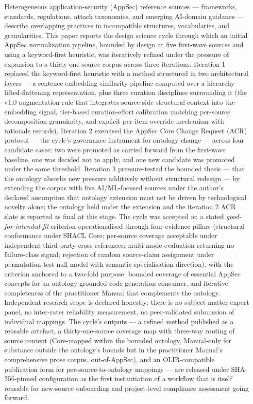 \documentclass[
]{article}
\begin{document}
Heterogeneous application-security (AppSec) reference sources ---
frameworks, standards, regulations, attack taxonomies, and emerging
AI-domain guidance --- describe overlapping practices in incompatible
structures, vocabularies, and granularities. This paper reports the
design science cycle through which an initial AppSec normalization
pipeline, bounded by design at five first-wave sources and using a
keyword-first heuristic, was iteratively refined under the pressure of
expansion to a thirty-one-source corpus across three iterations.
Iteration 1 replaced the keyword-first heuristic with a method
structured in two architectural layers --- a sentence-embedding
similarity pipeline computed over a hierarchy-lifted-flattening
representation, plus three curation disciplines surrounding it (the v1.0
augmentation rule that integrates source-side structural context into
the embedding signal, tier-based curation-effort calibration matching
per-source decomposition granularity, and explicit per-item override
mechanism with rationale records). Iteration 2 exercised the AppSec Core
Change Request (ACR) protocol --- the cycle's governance instrument for
ontology change --- across four candidate cases: two were promoted as
carried forward from the first-wave baseline, one was decided not to
apply, and one new candidate was promoted under the same threshold.
Iteration 3 pressure-tested the bounded thesis --- that the ontology
absorbs new pressure additively without structural redesign --- by
extending the corpus with five AI/ML-focused sources under the author's
declared assumption that ontology extension must not be driven by
technological novelty alone; the ontology held under the extension and
the iteration 2 ACR slate is reported as final at this stage. The cycle
was accepted on a stated \emph{good-for-intended-fit} criterion
operationalised through four evidence pillars (structural conformance
under SHACL Core; per-source coverage acceptable under independent
third-party cross-references; multi-mode evaluation returning no
failure-class signal; rejection of random source-claim assignment under
permutation-test null model with semantic-specialisation direction),
with the criterion anchored to a two-fold purpose: bounded coverage of
essential AppSec concepts for an ontology-grounded code-generation
consumer, and iterative completeness of the practitioner Manual that
complements the ontology. Independent-research scope is declared
honestly: there is no subject-matter-expert panel, no inter-rater
reliability measurement, no peer-validated submission of individual
mappings. The cycle's outputs --- a refined method published as a
reusable artefact, a thirty-one-source coverage map with three-way
routing of source content (Core-mapped within the bounded ontology,
Manual-only for substance outside the ontology's bounds but in the
practitioner Manual's comprehensive prose corpus, out-of-AppSec), and an
OLIR-compatible publication form for per-source-to-ontology mappings ---
are released under SHA-256-pinned configuration as the first
instantiation of a workflow that is itself reusable for new-source
onboarding and project-level compliance assessment going forward.
\end{document}
